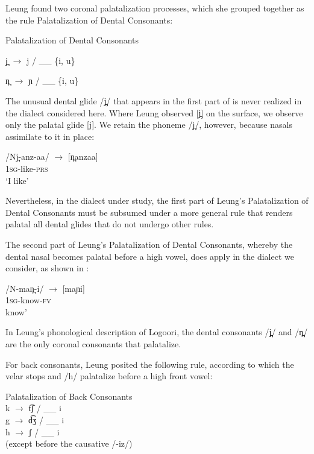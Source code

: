\documentclass[output=paper]{langsci/langscibook}
\begin{document}
Leung found two coronal palatalization processes, which she grouped together as the rule Palatalization of Dental Consonants:


\ea\label{ex:glewwe:1}

Palatalization of Dental Consonants \citep[117]{Leung1991}




j̪ $\rightarrow$ j / \_\_ \{i, u\}

n̪ $\rightarrow$ ɲ / \_\_ \{i, u\}
\z


The unusual dental glide /j̪/ that appears in the first part of  is never realized in the dialect considered here. Where Leung observed [j̪] on the surface, we observe only the palatal glide [j]. We retain the phoneme /j̪/, however, because nasals assimilate to it in place:

\ea{}
 /Nj̪-anz-aa/  $\rightarrow$  [n̪anzaa]  \\{}
\textsc{1sg}{}-like-\textsc{prs}\\{}
\glt ‘I like’
\z

Nevertheless, in the dialect under study, the first part of Leung’s Palatalization of Dental Consonants must be subsumed under a more general rule that renders palatal all dental glides that do not undergo other rules.

The second part of Leung’s Palatalization of Dental Consonants, whereby the dental nasal becomes palatal before a high vowel, does apply in the dialect we consider, as shown in :


\ea\label{ex:glewwe:3}{}
 /N-man̪-i/  $\rightarrow$  [maɲi]   \\{} 
\textsc{1sg}-know-\textsc{fv}\\{}
 know’
\z

In Leung’s phonological description of Logoori, the dental consonants /j̪/ and /n̪/ are the only coronal consonants that palatalize.    

For back consonants, Leung posited the following rule, according to which the velar stops and /h/ palatalize before a high front vowel:


\ea{}
Palatalization of Back Consonants \citep[116]{Leung1991}\\{}
k $\rightarrow$ t͡ʃ / \_\_ i
\\{}
g $\rightarrow$ d͡ʒ / \_\_ i
\\{}
h $\rightarrow$ ʃ / \_\_ i      
\\{}
(except before the causative /-iz/)
\z
\end{document}
